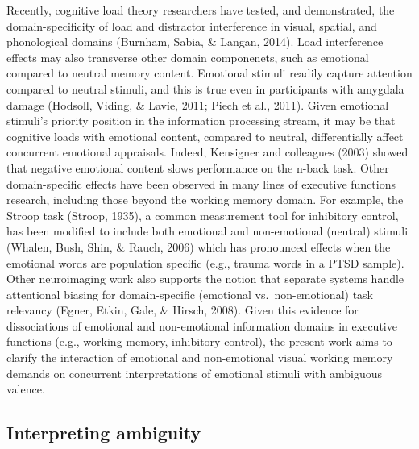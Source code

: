 \documentclass[man]{apa6}
\begin{document}
Recently, cognitive load theory researchers have tested, and demonstrated, the domain-specificity of load and distractor interference in visual, spatial, and phonological domains (Burnham, Sabia, \& Langan, 2014). Load interference effects may also transverse other domain componenets, such as emotional compared to neutral memory content. Emotional stimuli readily capture attention compared to neutral stimuli, and this is true even in participants with amygdala damage (Hodsoll, Viding, \& Lavie, 2011; Piech et al., 2011). Given emotional stimuli's priority position in the information processing stream, it may be that cognitive loads with emotional content, compared to neutral, differentially affect concurrent emotional appraisals. Indeed, Kensigner and colleagues (2003) showed that negative emotional content slows performance on the n-back task. Other domain-specific effects have been observed in many lines of executive functions research, including those beyond the working memory domain. For example, the Stroop task (Stroop, 1935), a common measurement tool for inhibitory control, has been modified to include both emotional and non-emotional (neutral) stimuli (Whalen, Bush, Shin, \& Rauch, 2006) which has pronounced effects when the emotional words are population specific (e.g., trauma words in a PTSD sample). Other neuroimaging work also supports the notion that separate systems handle attentional biasing for domain-specific (emotional vs.~non-emotional) task relevancy (Egner, Etkin, Gale, \& Hirsch, 2008). Given this evidence for dissociations of emotional and non-emotional information domains in executive functions (e.g., working memory, inhibitory control), the present work aims to clarify the interaction of emotional and non-emotional visual working memory demands on concurrent interpretations of emotional stimuli with ambiguous valence.

\hypertarget{interpreting-ambiguity}{%
\subsection{Interpreting ambiguity}\label{interpreting-ambiguity}}
\end{document}
